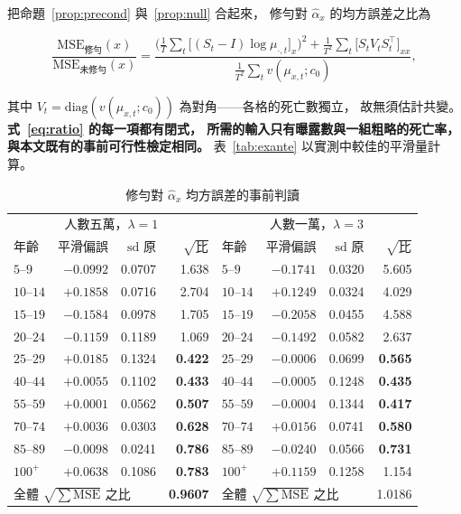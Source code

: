 \documentclass[UTF8, fontset=macnew, a4paper, 12pt]{ctexart}
\begin{document}
把命題~\ref{prop:precond} 與~\ref{prop:null} 合起來，
修勻對 $\hat\alpha_x$ 的均方誤差之比為

\begin{equation}\label{eq:ratio}
\frac{\mathrm{MSE}_{\text{修勻}}(x)}{\mathrm{MSE}_{\text{未修勻}}(x)}
=\frac{\Big(\tfrac1T\sum_t\big[(S_t-I)\log\mu_{\cdot,t}\big]_x\Big)^{2}
+\tfrac1{T^2}\sum_t\big[S_tV_tS_t^{\top}\big]_{xx}}
{\tfrac1{T^2}\sum_t v(\mu_{x,t};c_0)} ,
\end{equation}

其中 $V_t=\mathrm{diag}(v(\mu_{x,t};c_0))$ 為對角——各格的死亡數獨立，
故無須估計共變。\textbf{式~\eqref{eq:ratio} 的每一項都有閉式， 所需的輸入只有曝露數與一組粗略的死亡率，與本文既有的事前可行性檢定相同。}
表~\ref{tab:exante} 以實測中較佳的平滑量計算。

\begin{table}[H]
\centering
\caption{修勻對 $\hat\alpha_x$ 均方誤差的事前判讀}
\small
\renewcommand{\arraystretch}{1.05}
\begin{tabular}{lrrr|lrrr}
\toprule
\multicolumn{4}{c|}{人數五萬，$\lambda=1$} & \multicolumn{4}{c}{人數一萬，$\lambda=3$}\\
年齡 & 平滑偏誤 & $\mathrm{sd}$ 原 & $\sqrt{\text{比}}$ &
年齡 & 平滑偏誤 & $\mathrm{sd}$ 原 & $\sqrt{\text{比}}$\\
\midrule
$5$--$9$   & $-0.0992$ & 0.0707 & 1.638 & $5$--$9$   & $-0.1741$ & 0.0320 & 5.605\\
$10$--$14$ & $+0.1858$ & 0.0716 & 2.704 & $10$--$14$ & $+0.1249$ & 0.0324 & 4.029\\
$15$--$19$ & $-0.1584$ & 0.0978 & 1.705 & $15$--$19$ & $-0.2058$ & 0.0455 & 4.588\\
$20$--$24$ & $-0.1159$ & 0.1189 & 1.069 & $20$--$24$ & $-0.1492$ & 0.0582 & 2.637\\
$25$--$29$ & $+0.0185$ & 0.1324 & \textbf{0.422} & $25$--$29$ & $-0.0006$ & 0.0699 & \textbf{0.565}\\
$40$--$44$ & $+0.0055$ & 0.1102 & \textbf{0.433} & $40$--$44$ & $-0.0005$ & 0.1248 & \textbf{0.435}\\
$55$--$59$ & $+0.0001$ & 0.0562 & \textbf{0.507} & $55$--$59$ & $-0.0004$ & 0.1344 & \textbf{0.417}\\
$70$--$74$ & $+0.0036$ & 0.0303 & \textbf{0.628} & $70$--$74$ & $+0.0156$ & 0.0741 & \textbf{0.580}\\
$85$--$89$ & $-0.0098$ & 0.0241 & \textbf{0.786} & $85$--$89$ & $-0.0240$ & 0.0566 & \textbf{0.731}\\
$100^{+}$  & $+0.0638$ & 0.1086 & \textbf{0.783} & $100^{+}$  & $+0.1159$ & 0.1258 & 1.154\\
\midrule
\multicolumn{3}{l}{全體 $\sqrt{\sum\mathrm{MSE}}$ 之比} & \textbf{0.9607} &
\multicolumn{3}{l}{全體 $\sqrt{\sum\mathrm{MSE}}$ 之比} & 1.0186\\
\bottomrule
\end{tabular}


\end{table}
\end{document}
